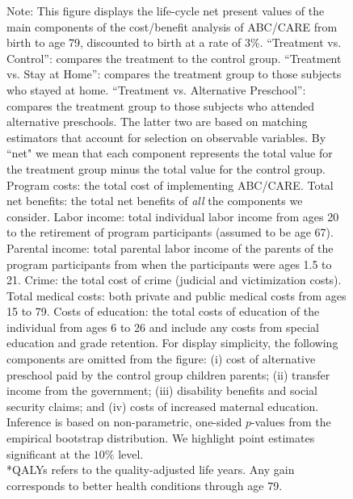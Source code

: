 \begin{figure}
{Note: This figure displays the life-cycle net present values of the main components of the cost/benefit analysis of ABC/CARE from birth to age 79, discounted to birth at a rate of 3\%. ``Treatment vs. Control'': compares the treatment to the control group. ``Treatment vs. Stay at Home'': compares the treatment group to those subjects who stayed at home. ``Treatment vs. Alternative Preschool'': compares the treatment group to those subjects who attended alternative preschools. The latter two are based on matching estimators that account for selection on observable variables. By ``net" we mean that each component represents the total value for the treatment group minus the total value for the control group. Program costs: the total cost of implementing ABC/CARE. Total net benefits: the total net benefits of \textit{all} the components we consider. Labor income: total individual labor income from ages 20 to the retirement of program participants  (assumed to be age 67). Parental income: total parental labor income of the parents of the program participants from when the participants were ages 1.5 to 21. Crime: the total cost of crime (judicial and victimization costs). Total medical costs: both private and public medical costs from ages 15 to 79. Costs of education: the total costs of education of the individual from ages 6 to 26 and include any costs from special education and grade retention. For display simplicity, the following components are omitted from the figure: (i) cost of alternative preschool paid by the control group children parents; (ii) transfer income from the government; (iii) disability benefits and social security claims; and (iv) costs of increased maternal education. Inference is based on non-parametric, one-sided $p$-values from the empirical bootstrap distribution. We highlight point estimates significant at the $10\%$ level.\\
*QALYs refers to the quality-adjusted life years. Any gain corresponds to better health conditions through age 79.\\
}
\end{figure}

